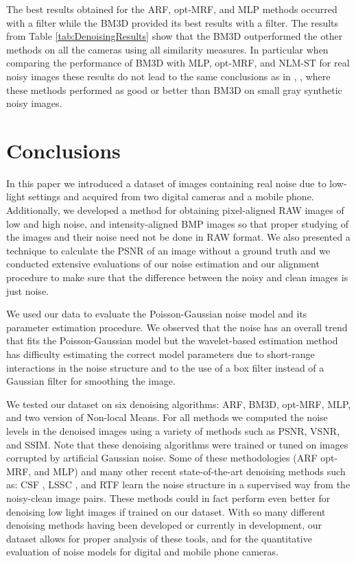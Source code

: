 \documentclass[review]{elsarticle}
\begin{document}
The best results obtained for the ARF, opt-MRF, and MLP methods occurred with a  filter while the BM3D provided its best results with a  filter. The results from Table \ref{tab:DenoisingResults} show that the BM3D outperformed the other methods on all the cameras using all similarity measures. In particular when comparing the performance of BM3D with MLP, opt-MRF, and NLM-ST for real noisy images these results do not lead to the same conclusions as in \cite{NeuralNetworkCompete}, \cite{optMRF}, \cite{lu2015non} where these methods performed as good or better than BM3D on small gray synthetic noisy images. 

\section{Conclusions}
In this paper we introduced a dataset of images containing real noise due to low-light settings and acquired from two digital cameras and a mobile phone. Additionally, we developed a method for obtaining pixel-aligned RAW images of low and high noise, and intensity-aligned BMP images so that proper studying of the images and their noise need not be  done in RAW format. We also presented a technique to calculate the PSNR of an image without a ground truth and we conducted extensive evaluations of our noise estimation and our alignment procedure to make sure that the difference between the noisy and clean images is just noise.

We used our data to evaluate the Poisson-Gaussian noise model  \cite{Foi-Poisson} and its parameter estimation procedure. We observed that  the noise has an overall trend that fits the Poisson-Gaussian model but the wavelet-based estimation method has difficulty estimating the correct model parameters due to short-range interactions in the noise structure and to the use of a box filter instead of a Gaussian filter for smoothing the image.

We tested our dataset on six denoising algorithms: ARF, BM3D, opt-MRF, MLP, and two version of Non-local Means. For all methods we computed the noise levels in the denoised images using a variety of methods such as PSNR, VSNR, and SSIM. Note that these denoising algorithms were trained or tuned on images corrupted by artificial Gaussian noise. Some of these methodologies (ARF opt-MRF, and MLP) and many other recent state-of-the-art denoising methods such as: CSF \cite{Shrinkagefields}, LSSC \cite{mairal2009non}, and RTF \cite{Loss-specific} learn the noise structure in a supervised way from the noisy-clean image pairs. These methods could in fact perform even better for denoising low light images if trained on our dataset. With so many different denoising methods having been developed or currently in development, our dataset allows for proper analysis of these tools, and for the quantitative evaluation of noise models for digital and mobile phone cameras. 
\end{document}
